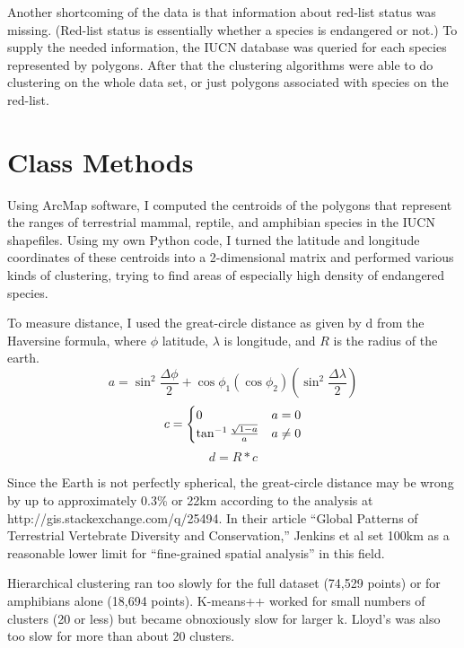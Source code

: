 \documentclass[11pt, fullpage,letterpaper]{article}
\begin{document}
		Another shortcoming of the data is that information about red-list status was missing. (Red-list status is essentially whether a species is endangered or not.) To supply the needed information, the IUCN database was queried for each species represented by polygons. After that the clustering algorithms were able to do clustering on the whole data set, or just polygons associated with species on the red-list. 
	
	\section{Class Methods}
		Using ArcMap software, I computed the centroids of the polygons that represent the ranges of terrestrial mammal, reptile, and amphibian species in the IUCN shapefiles. Using my own Python code, I turned the latitude and longitude coordinates of these centroids into a 2-dimensional matrix and performed various kinds of clustering, trying to find areas of especially high density of endangered species.
	
		To measure distance, I used the great-circle distance as given by d from the Haversine formula, where $\phi$ latitude, $\lambda$ is longitude, and $R$ is the radius of the earth.
		\begin{equation}
			a = \sin^2 \frac{\Delta\phi}{2} + \cos \phi_1 (\cos \phi_2)  (\sin^2 \frac{\Delta\lambda}{2})
		\end{equation}
		\begin{equation}
			c =  \begin{cases} 
					0 & a = 0 \cr \tan^{-1}{\frac{\sqrt{1-a}}{a}} & a \neq 0
				\end{cases}
		\end{equation}
		\begin{equation}
			d = R*c
		\end{equation}
	
		Since the Earth is not perfectly spherical, the great-circle distance may be wrong by up to approximately 0.3\% or 22km according to the analysis at http://gis.stackexchange.com/q/25494. In their article “Global Patterns of Terrestrial Vertebrate Diversity and Conservation,” Jenkins et al set 100km as a reasonable lower limit for “fine-grained spatial analysis” in this field.
	
		Hierarchical clustering ran too slowly for the full dataset (74,529 points) or for amphibians alone (18,694 points). K-means++ worked for small numbers of clusters (20 or less) but became obnoxiously slow for larger k. Lloyd’s was also too slow for more than about 20 clusters.
	
\end{document}
